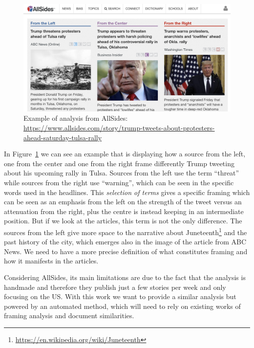 \begin{figure}[!htb]
    \centering
    \includegraphics[width=\linewidth]{figures/allsides.png}
    \caption{Example of analysis from AllSides: \url{https://www.allsides.com/story/trump-tweets-about-protesters-ahead-saturday-tulsa-rally}}
    \label{fig:allsides}
\end{figure}

In Figure~\ref{fig:allsides} we can see an example that is displaying how a source from the left, one from the center and one from the right frame differently Trump tweeting about his upcoming rally in Tulsa.
Sources from the left use the term ``threat'' while sources from the right use ``warning'', which can be seen in the specific words used in the headlines.
This \emph{selection of terms} gives a specific framing which can be seen as an emphasis from the left on the strength of the tweet versus an attenuation from the right, plus the centre is instead keeping in an intermediate position.
But if we look at the articles, this term is not the only difference. The sources from the left give more space to the narrative about Juneteenth\footnote{\url{https://en.wikipedia.org/wiki/Juneteenth}} and the past history of the city, which emerges also in the image of the article from ABC News.
We need to have a more precise definition of what constitutes framing and how it manifests in the articles.

Considering AllSides, its main limitations are due to the fact that the analysis is handmade and therefore they publish just a few stories per week and only focusing on the US.
With this work we want to provide a similar analysis but powered by an automated method, which will need to rely on existing works of framing analysis and document similarities.

